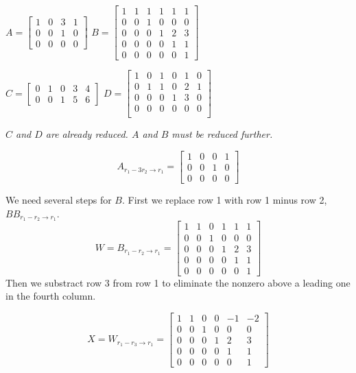 \documentclass{article}
\begin{document}
$A= \left[\begin{array}{cccc}
1 & 0 & 3 & 1 \\
0 & 0 & 1 & 0 \\
0 & 0 & 0 & 0
\end{array}\right]$ $B= \left[\begin{array}{cccccc}
1 & 1 & 1 & 1 & 1 & 1\\
0 & 0 & 1 & 0 & 0 & 0\\
0 & 0 & 0 & 1 & 2 & 3\\
0 & 0 & 0 & 0 & 1 & 1\\
0 & 0 & 0 & 0 & 0 & 1
\end{array}\right]$ 

$C= \left[\begin{array}{ccccc}
0 & 1 & 0 & 3 & 4\\
0 & 0 & 1 & 5 & 6
\end{array}\right]$ $D= \left[\begin{array}{cccccc}
1 & 0 & 1 & 0 & 1 & 0\\
0 & 1 & 1 & 0 & 2 & 1\\
0 & 0 & 0 & 1 & 3 & 0\\
0 & 0 & 0 & 0 & 0 & 0\\
\end{array}\right]$



\bigskip{}

\it $C$ and $D$ are already reduced. $A$ and $B$ must be reduced further.

$$A_{r_1-3r_2\rightarrow r_1}= \left[\begin{array}{cccc}
1 & 0 & 0 & 1 \\
0 & 0 & 1 & 0 \\
0 & 0 & 0 & 0
\end{array}\right]$$

We need several steps for $B$. First we replace row 1 with row 1 minus row 2, $BB_{r_1-r_2\rightarrow r_1}$.
$$W = B_{r_1-r_2\rightarrow r_1}= \left[\begin{array}{cccccc}
1 & 1 & 0 & 1 & 1 & 1\\
0 & 0 & 1 & 0 & 0 & 0\\
0 & 0 & 0 & 1 & 2 & 3\\
0 & 0 & 0 & 0 & 1 & 1\\
0 & 0 & 0 & 0 & 0 & 1
\end{array}\right]$$ 
Then we substract row 3 from row 1 to eliminate the nonzero above a leading one in the fourth column. 

$$X = W_{r_1-r_3\rightarrow r_1} = \left[\begin{array}{cccccc}
1 & 1 & 0 & 0 & -1 & -2\\
0 & 0 & 1 & 0 & 0 & 0\\
0 & 0 & 0 & 1 & 2 & 3\\
0 & 0 & 0 & 0 & 1 & 1\\
0 & 0 & 0 & 0 & 0 & 1
\end{array}\right]$$ 
\end{document}
